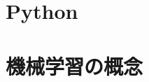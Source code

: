 \documentclass[a4paper,11pt,vartwoside,openany,dvipdfmx]{jsbook}
\begin{document}
\maketitle
\tableofcontents

\chapter{Python}


\chapter{機械学習の概念}




\end{document}
